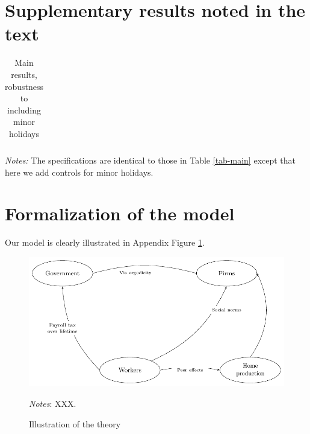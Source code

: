 \documentclass[12pt,pdftex, notitlepage]{article}
\let\footnotesize=\small
\begin{document}
\section{Supplementary results noted in the text  \label{app_figs_tables}}

\setcounter{figure}{0}
\renewcommand{\figurename}{Appendix Figure}
\setcounter{table}{0}
\renewcommand{\tablename}{Appendix Table}

\renewcommand{\thetable}{\thesection.\arabic{table}}
\renewcommand{\thefigure}{\thesection.\arabic{figure}}


\begin{table}[h]
\def\sym#1{\ifmmode^{#1}\else\(^{#1}\)\fi}
\caption{Main results, robustness to including minor holidays \label{tab-main-robust}}
\scriptsize{
\begin{tabular}{l  cc cc cc cc   }
\toprule

\bottomrule
\end{tabular}
}
\raggedright
\footnotesize{\textit{Notes:} The specifications are identical to those in Table \ref{tab-main} except that here we add controls for minor holidays.}
\end{table}


\newpage \clearpage
\section{Formalization of the model}\label{app-sec-model}

\setcounter{figure}{0}
\renewcommand{\figurename}{Appendix Figure}
\setcounter{table}{0}
\renewcommand{\tablename}{Appendix Table}

\renewcommand{\thetable}{\thesection.\arabic{table}}
\renewcommand{\thefigure}{\thesection.\arabic{figure}}

Our model is clearly illustrated in Appendix Figure \ref{fig-model}.


\vspace{2cm}

\begin{figure}[h]
	\caption{Illustration of the theory} \label{fig-model}
	\centerline{\includegraphics[width=7in]{figures/fake_model_flow.pdf}}
	
\noindent \raggedright	
\footnotesize{\textit{Notes}:  XXX.}

\end{figure}
\end{document}
